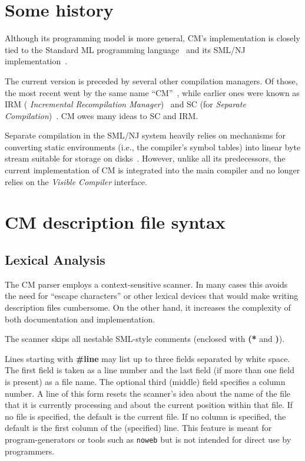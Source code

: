 \documentclass[titlepage,letterpaper]{article}
\begin{document}
\section{Some history}

Although its programming model is more general, CM's implementation is
closely tied to the Standard ML programming language~\cite{milner97}
and its SML/NJ implementation~\cite{appel91:sml}.

The current version is preceded by several other compilation managers.
Of those, the most recent went by the same name
``CM''~\cite{blume95:cm}, while earlier ones were known as IRM ({\it
Incremental Recompilation Manager})~\cite{harper94:irm} and SC (for
{\it Separate Compilation})~\cite{harper-lee-pfenning-rollins-CM}.  CM
owes many ideas to SC and IRM.

Separate compilation in the SML/NJ system heavily relies on mechanisms
for converting static environments (i.e., the compiler's symbol
tables) into linear byte stream suitable for storage on
disks~\cite{appel94:sepcomp}.  However, unlike all its predecessors,
the current implementation of CM is integrated into the main compiler
and no longer relies on the {\em Visible Compiler} interface.

\pagebreak

\appendix

\section{CM description file syntax}

\subsection{Lexical Analysis}

The CM parser employs a context-sensitive scanner.  In many cases this
avoids the need for ``escape characters'' or other lexical devices
that would make writing description files cumbersome.  On the other
hand, it increases the complexity of both documentation and implementation.

The scanner skips all nestable SML-style comments (enclosed with {\bf
(*} and {\bf *)}).

Lines starting with {\bf \#line} may list up to three fields separated
by white space.  The first field is taken as a line number and the
last field (if more than one field is present) as a file name.  The
optional third (middle) field specifies a column number.  A line of
this form resets the scanner's idea about the name of the file that it
is currently processing and about the current position within that
file.  If no file is specified, the default is the current file.  If
no column is specified, the default is the first column of the
(specified) line.  This feature is meant for program-generators or
tools such as {\tt noweb} but is not intended for direct use by
programmers.
\end{document}
